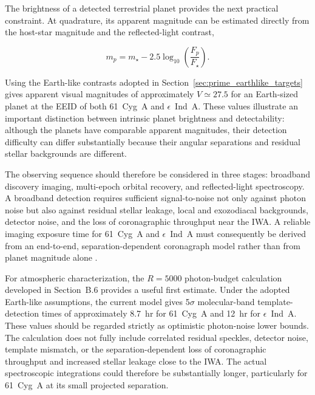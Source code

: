 The brightness of a detected terrestrial planet provides the next practical
constraint. At quadrature, its apparent magnitude can be estimated directly
from the host-star magnitude and the reflected-light contrast,

\begin{equation}
m_p
=
m_\star
-
2.5\log_{10}
\left(
\frac{F_p}{F_\star}
\right).
\label{eq:planet_magnitude}
\end{equation}

Using the Earth-like contrasts adopted in Section~\ref{sec:prime_earthlike_targets} 
gives apparent visual magnitudes of approximately $V\simeq27.5$ for an 
Earth-sized planet at the EEID of both 61~Cyg~A and $\epsilon$~Ind~A. 
These values illustrate an important distinction between intrinsic planet 
brightness and detectability: although the planets have comparable apparent 
magnitudes, their detection difficulty can differ substantially because 
their angular separations and residual stellar backgrounds are different.

The observing sequence should therefore be considered in three stages:
broadband discovery imaging, multi-epoch orbital recovery, and
reflected-light spectroscopy. A broadband detection requires sufficient
signal-to-noise not only against photon noise but also against residual
stellar leakage, local and exozodiacal backgrounds, detector noise, and
the loss of coronagraphic throughput near the IWA. A reliable imaging
exposure time for 61~Cyg~A and $\epsilon$~Ind~A must consequently be derived
from an end-to-end, separation-dependent coronagraph model rather than from
planet magnitude alone \cite{nemati23,krist23}.

For atmospheric characterization, the $R=5000$ photon-budget calculation
developed in Section~B.6 provides a useful first estimate. Under the adopted
Earth-like assumptions, the current model gives 5$\sigma$ molecular-band
template-detection times of approximately 8.7~hr for 61~Cyg~A and 12~hr for
$\epsilon$~Ind~A. These values should be regarded strictly as optimistic
photon-noise lower bounds. The calculation does not fully include correlated
residual speckles, detector noise, template mismatch, or the
separation-dependent loss of coronagraphic throughput and increased stellar
leakage close to the IWA. The actual spectroscopic integrations could
therefore be substantially longer, particularly for 61~Cyg~A at its small
projected separation.

